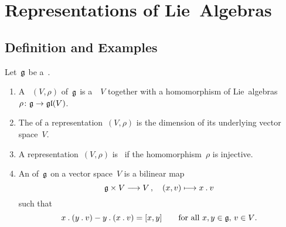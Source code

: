 \chapter{Representations of Lie~Algebras}







\section{Definition and Examples}


\begin{definition}
  Let~$\mathfrak{g}$ be a~{\liealgebra{$\kf$}}.
  \begin{enumerate}
    \item
      A ~$(V, \rho)$ of~$\mathfrak{g}$ is a~{\vectorspace{$\kf$}}~$V$ together with a homomorphism of Lie~algebras~$\rho \colon \glie \to \gllie(V)$.
    \item
      The  of a representation~$(V, \rho)$ is the dimension of its underlying vector space~$V$.
    \item
      A representation~$(V, \rho)$ is~ if the homomorphism~$\rho$ is injective.
    \item
      An  of~$\mathfrak{g}$ on a vector space~$V$ is a bilinear map
      \[
        \glie \times V \to V \,,
        \quad
        (x,v) \mapsto x \act v
      \]
      such that
      \[
        x \mathbin{.} (y \mathbin{.} v) - y \mathbin{.} (x \mathbin{.} v)
        =
        [x,y]
        \qquad
        \text{for all~$x, y \in \mathfrak{g}$,~$v \in V$.}
      \]
  \end{enumerate}
\end{definition}


